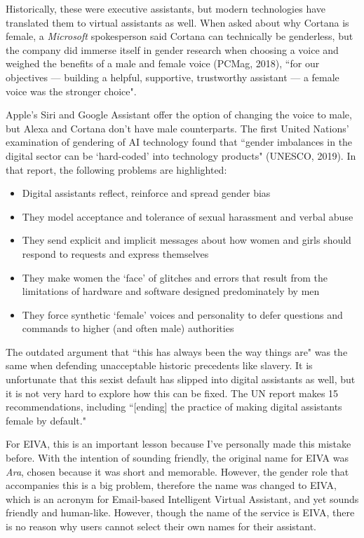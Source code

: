 \documentclass{article}
\begin{document}
Historically, these were executive assistants, but modern technologies have translated them to virtual assistants as well. When asked about why Cortana is female, a \emph{Microsoft} spokesperson said Cortana can technically be genderless, but the company did immerse itself in gender research when choosing a voice and weighed the benefits of a male and female voice (PCMag, 2018), ``for our objectives — building a helpful, supportive, trustworthy assistant — a female voice was the stronger choice".

Apple's Siri and Google Assistant offer the option of changing the voice to male, but Alexa and Cortana don't have male counterparts. The first United Nations' examination of gendering of AI technology found that ``gender imbalances in the digital sector can be `hard-coded' into technology products" (UNESCO, 2019). In that report, the following problems are highlighted:

\begin{itemize}
  \item Digital assistants reflect, reinforce and spread gender bias
  \item They model acceptance and tolerance of sexual harassment and verbal abuse
  \item They send explicit and implicit messages about how women and girls should respond to requests and express themselves
  \item They make women the ‘face’ of glitches and errors that result from the limitations of hardware and software designed predominately by men
  \item They force synthetic ‘female’ voices and personality to defer questions and commands to higher (and often male) authorities
\end{itemize}

The outdated argument that ``this has always been the way things are" was the same when defending unacceptable historic precedents like slavery. It is unfortunate that this sexist default has slipped into digital assistants as well, but it is not very hard to explore how this can be fixed. The UN report makes 15 recommendations, including ``[ending] the practice of making digital assistants female by default."

For EIVA, this is an important lesson because I've personally made this mistake before. With the intention of sounding friendly, the original name for EIVA was \emph{Ara}, chosen because it was short and memorable. However, the gender role that accompanies this is a big problem, therefore the name was changed to EIVA, which is an acronym for Email-based Intelligent Virtual Assistant, and yet sounds friendly and human-like. However, though the name of the service is EIVA, there is no reason why users cannot select their own names for their assistant.
\end{document}
